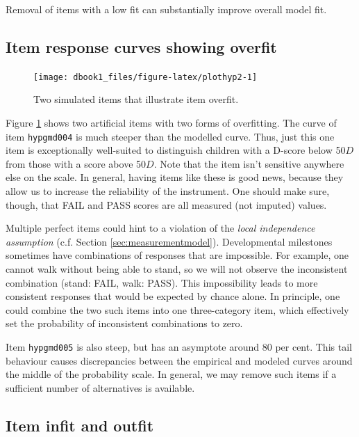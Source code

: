 \documentclass[
]{book}
\begin{document}
Removal of items with a low fit can substantially improve overall model fit.

\hypertarget{item-response-curves-showing-overfit}{%
\subsection{Item response curves showing overfit}\label{item-response-curves-showing-overfit}}

\begin{figure}

{\centering \texttt{[image: dbook1\_files/figure-latex/plothyp2-1]} 

}

\caption{Two simulated items that illustrate item overfit.}\label{fig:plothyp2}
\end{figure}



Figure \ref{fig:plothyp2} shows two artificial items with two forms of overfitting. The curve of item \texttt{hypgmd004} is much steeper than the modelled curve. Thus, just this one item is exceptionally well-suited to distinguish children with a D-score below 50\(D\) from those with a score above 50\(D\). Note that the item isn't sensitive anywhere else on the scale. In general, having items like these is good news, because they allow us to increase the reliability of the instrument. One should make sure, though, that FAIL and PASS scores are all measured (not imputed) values.

Multiple perfect items could hint to a violation of the \emph{local independence assumption} (c.f. Section \ref{sec:measurementmodel}). Developmental milestones sometimes have combinations of responses that are impossible. For example, one cannot walk without being able to stand, so we will not observe the inconsistent combination (stand: FAIL, walk: PASS). This impossibility leads to more consistent responses that would be expected by chance alone. In principle, one could combine the two such items into one three-category item, which effectively set the probability of inconsistent combinations to zero.

Item \texttt{hypgmd005} is also steep, but has an asymptote around 80 per cent. This tail behaviour causes discrepancies between the empirical and modeled curves around the middle of the probability scale. In general, we may remove such items if a sufficient number of alternatives is available.

\hypertarget{sec:infit}{%
\subsection{Item infit and outfit}\label{sec:infit}}
\end{document}
